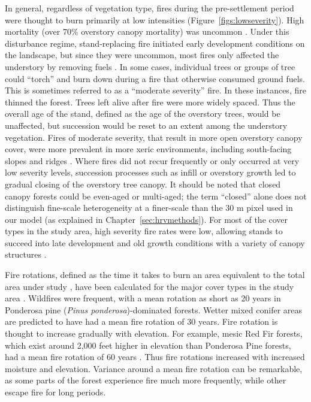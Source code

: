 In general, regardless of vegetation type, fires during the pre-settlement period were thought to burn primarily at low intensities (Figure~\ref{figs:lowseverity}). High mortality (over 70\% overstory canopy mortality) was uncommon \citep{Skinner1996, SNEP1996a,Mallek2013}. Under this disturbance regime, stand-replacing fire initiated early development conditions on the landscape, but since they were uncommon, most fires only affected the understory by removing fuels \citep{Skinner1996, SNEP1996a,Mallek2013}. In some cases, individual trees or groups of tree could ``torch'' and burn down during a fire that otherwise consumed ground fuels. This is sometimes referred to as a ``moderate severity'' fire. In these instances, fire thinned the forest. Trees left alive after fire were more widely spaced. Thus the overall age of the stand, defined as the age of the overstory trees, would be unaffected, but succession would be reset to an extent among the understory vegetation. Fires of moderate severity, that result in more open overstory canopy cover, were more prevalent in more xeric environments, including south-facing slopes and ridges \citep{Mallek2013,Safford2014,SNEP1996a,SNEP1996}. Where fires did not recur frequently or only occurred at very low severity levels, succession processes such as infill or overstory growth led to gradual closing of the overstory tree canopy. It should be noted that closed canopy forests could be even-aged or multi-aged; the term ``closed'' alone does not distinguish fine-scale heterogeneity at a finer-scale than the 30 m pixel used in our model (as explained in Chapter~\ref{sec:hrvmethods}). For most of the cover types in the study area, high severity fire rates were low, allowing stands to succeed into late development and old growth conditions with a variety of canopy structures \citep{Mallek2013,Safford2014,SNEP1996a,SNEP1996}. 


Fire rotations, defined as the time it takes to burn an area equivalent to the total area under study \citep{Agee1993}, have been calculated for the major cover types in the study area \citep{Mallek2013}. Wildfires were frequent, with a mean rotation as short as 20 years in Ponderosa pine (\emph{Pinus ponderosa})-dominated forests. Wetter mixed conifer areas are predicted to have had a mean fire rotation of 30 years. Fire rotation is thought to increase gradually with elevation. For example, mesic Red Fir forests, which exist around 2,000 feet higher in elevation than Ponderosa Pine forests, had a mean fire rotation of 60 years \citep{Mallek2013}. Thus fire rotations increased with increased moisture and elevation. Variance around a mean fire rotation can be remarkable, as some parts of the forest experience fire much more frequently, while other escape fire for long periods. 

